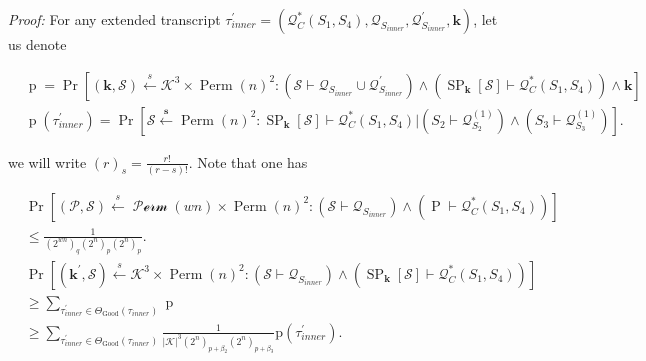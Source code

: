 \noindent \emph{Proof:}  For any extended transcript $\tau_{inner}^{\prime}=\left(\mathcal{Q}_{C}^{*}\left(S_{1}, S_{4}\right), \mathcal{Q}_{S_{inner}}, \mathcal{Q}_{S_{inner}}^{\prime}, \mathbf{k}\right)$, let us denote

$$
\begin{aligned}
&\operatorname{p} =  \operatorname{Pr}\left[\left(\mathbf{k}, \mathcal{S}\right) \stackrel{s}{\leftarrow} \mathcal{K}^{3} \times \operatorname{Perm}(n)^{2}:
\left(\mathcal{S} \vdash \mathcal{Q}_{S_{inner}} \cup \mathcal{Q}_{S_{inner}}^{\prime}\right) \wedge \left(\operatorname{SP}_{\mathbf{k}}[\mathcal{S}] \vdash \mathcal{Q}_{C}^{*}\left(S_{1},S_{4}\right)\right) \wedge\mathbf{k}\right]\\
&\operatorname{p}\left(\tau_{inner}^{\prime}\right) =\operatorname{Pr}\left[\mathcal{S} \stackrel{\mathbf{s}}{\leftarrow} \operatorname{Perm}(n)^{2}: \operatorname{SP}_{\mathbf{k}}[\mathcal{S}] \vdash \mathcal{Q}_{C}^{*}\left(S_{1},S_{4}\right) |\left(S_{2} \vdash \mathcal{Q}_{S_{2}}^{(1)}\right) \wedge\left(S_{3} \vdash \mathcal{Q}_{S_{3}}^{(1)}\right)\right].
\end{aligned}
$$

we will write $(r)_{s} = \frac{r!}{(r-s)!}$. Note that one has

$$
\begin{aligned}
&\operatorname{Pr}\left[(\mathcal{P}, \mathcal{S}) \stackrel{s}{\leftarrow} \mathcal{\operatorname{Perm}}(w n) \times \operatorname{Perm}(n)^{2}:\left(\mathcal{S} \vdash \mathcal{Q}_{S_{inner}}\right) \wedge\left(\operatorname{P} \vdash \mathcal{Q}_{C}^{*}\left(S_{1},S_{4}\right)\right)\right] \\
&\leq  \frac{1}{\left(2^{w n}\right)_{q}\left(2^{n}\right)_{p}\left(2^{n}\right)_{p}}. \\
&\operatorname{Pr}\left[(\mathbf{k}^{\prime}, \mathcal{S}) \stackrel{s}{\leftarrow} \mathcal{K}^{3} \times \operatorname{Perm}(n)^{2}:\left(\mathcal{S} \vdash \mathcal{Q}_{S_{inner}}\right) \wedge\left(\operatorname{SP}_{\mathbf{k}}[\mathcal{S}] \vdash \mathcal{Q}_{C}^{*}\left(S_{1},S_{4}\right)\right)\right] \\
& \geq \sum_{\tau_{inner}^{\prime} \in \Theta_{\mathrm{Good}}(\tau_{inner})} \operatorname{p}\\
&\geq \sum_{\tau_{inner}^{\prime} \in \Theta_{\mathrm{Good}}(\tau_{inner})} \frac{1}{|\mathcal{K}|^{3}\left(2^{n}\right)_{p+\beta_{2}}\left(2^{n}\right)_{p+\beta_{3}}} \mathrm{p}\left(\tau_{inner}^{\prime}\right).
\end{aligned}
$$

